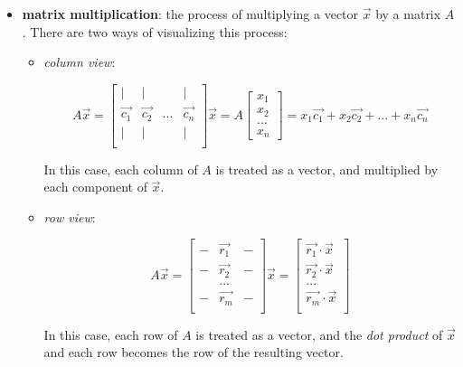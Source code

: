 \documentclass[12pt]{article}
\begin{document}
{{\begin{itemize}
        \item \textbf{matrix multiplication}: the process of multiplying a vector $\Vec{x}$ by a matrix $A$. There are two ways of visualizing this process:
        
        \begin{itemize}
            \item \textit{column view}:
            
            $$A \Vec{x} = \begin{bmatrix}
            | &| & &|\\
            \Vec{c_1} &\Vec{c_2} &... &\Vec{c_n}\\
            | &| & &|\\
            \end{bmatrix}\Vec{x} = A\begin{bmatrix}
            x_1\\
            x_2\\
            ...\\
            x_n
            \end{bmatrix} = x_1 \Vec{c_1} + x_2 \Vec{c_2} + ... + x_n \Vec{c_n}
            $$
            
            In this case, each column of $A$ is treated as a vector, and multiplied by each component of $\Vec{x}$.
        
        \item \textit{row view}:

        $$A\Vec{x} = \begin{bmatrix}
        - & \Vec{r_1} &-\\
        - & \Vec{r_2} &-\\
         & ... &\\
        - & \Vec{r_m} &-\\
        \end{bmatrix}\Vec{x}=\begin{bmatrix}
        \Vec{r_1} \cdot \Vec{x}\\
        \Vec{r_2} \cdot \Vec{x}\\
        ...\\
        \Vec{r_m} \cdot \Vec{x}\\
        \end{bmatrix}$$
        
        In this case, each row of $A$ is treated as a vector, and the \textit{dot product} of $\Vec{x}$ and each row becomes the row of the resulting vector.
        
        \end{itemize}
        

\end{itemize}}}
\end{document}
